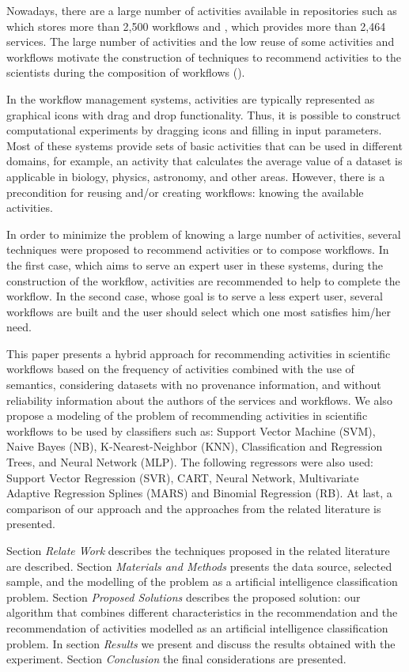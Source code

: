 \documentclass{doublecol-new}
\theoremstyle{TH}{
\newtheorem{lemma}{Lemma}
\newtheorem{theorem}[lemma]{Theorem}
\newtheorem{corrolary}[lemma]{Corrolary}
\newtheorem{conjecture}[lemma]{Conjecture}
\newtheorem{proposition}[lemma]{Proposition}
\newtheorem{claim}[lemma]{Claim}
\newtheorem{stheorem}[lemma]{Wrong Theorem}
\newtheorem{algorithm}{Algorithm}
}
\theoremstyle{THrm}{
\newtheorem{definition}{Definition}[section]
\newtheorem{question}{Question}[section]
\newtheorem{remark}{Remark}
\newtheorem{scheme}{Scheme}
}
\theoremstyle{THhit}{
\newtheorem{case}{Case}[section]
}
\begin{document}
Nowadays, there are a large number of activities available in repositories such as \cite{ROURE2015} which stores more than 2,500 workflows and \cite{BioCatalogue2015}, which provides more than 2,464 services. The large number of activities and the low reuse of some activities and workflows motivate the construction of techniques to recommend activities to the scientists during the composition of workflows (\cite{Wang2010}).

In the workflow management systems, activities are typically represented as graphical icons with drag and drop functionality. Thus, it is possible to construct computational experiments by dragging icons and filling in input parameters. Most of these systems provide sets of basic activities that can be used in different domains, for example, an activity that calculates the average value of a dataset is applicable in biology, physics, astronomy, and other areas. However, there is a precondition for reusing and/or creating workflows: knowing the available activities.

In order to minimize the problem of knowing a large number of activities, several techniques were proposed to recommend activities or to compose workflows. In the first case, which aims to serve an expert user in these systems, during the construction of the workflow, activities are recommended to help to complete the workflow. In the second case, whose goal is to serve a less expert user, several workflows are built and the user should select which one most satisfies him/her need.

This paper presents a hybrid approach for recommending activities in scientific workflows based on the frequency of activities combined with the use of semantics, considering datasets with no provenance information, and without reliability information about the authors of the services and workflows. We also propose a modeling of the problem of recommending activities in scientific workflows to be used by classifiers such as: Support Vector Machine (SVM), Naive Bayes (NB), K-Nearest-Neighbor (KNN), Classification and Regression Trees, and Neural Network (MLP). The following regressors were also used: Support Vector Regression (SVR), CART, Neural Network, Multivariate Adaptive Regression Splines (MARS) and Binomial Regression (RB). At last, a comparison of our approach and the approaches from the related literature is presented.

Section \emph{Relate Work} describes the techniques proposed in the related literature are described. Section \emph{Materials and Methods} presents the data source, selected sample, and  the modelling of the problem as a artificial intelligence classification problem.
Section \emph{Proposed Solutions} describes the proposed solution: our algorithm that combines different characteristics in the recommendation and the recommendation of activities modelled as an artificial intelligence classification problem. In section \emph{Results} we present and discuss the results obtained with the experiment. Section \emph{Conclusion} the final considerations are presented.
\end{document}
